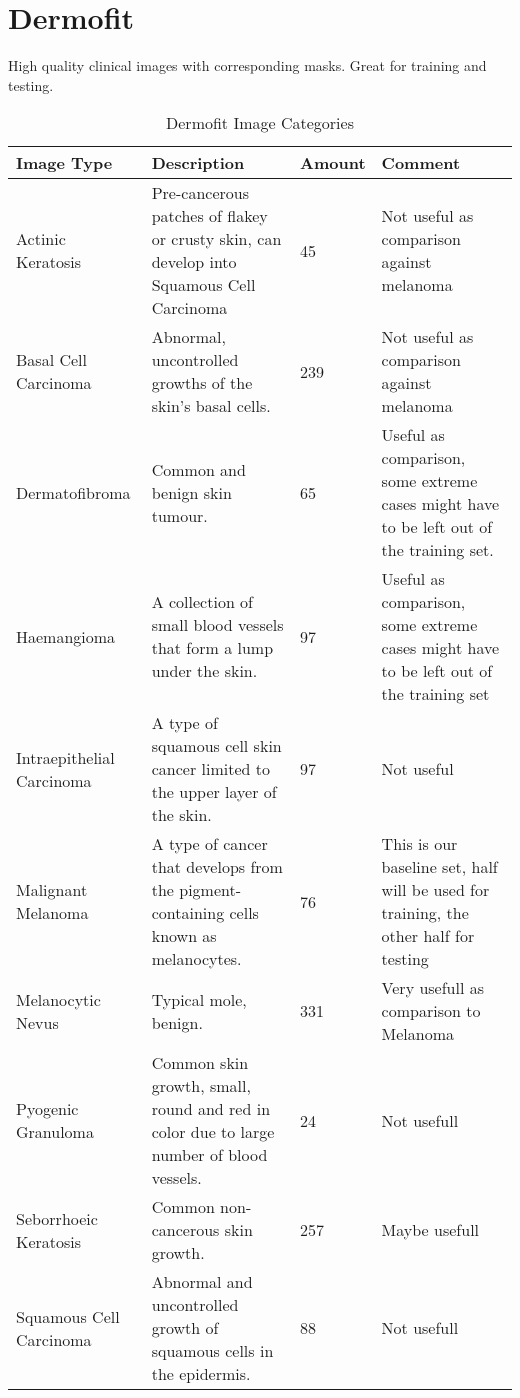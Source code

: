 \section{Dermofit}

High quality clinical images with corresponding masks. Great for training and testing.

\begin{table}[H]
\small
    \begin{tabular}{ | l | p{3.5cm} | l | p{3.5cm} |}
    \hline
    Image Type &  Description & Amount & Comment\\ \hline
    Actinic Keratosis &  Pre-cancerous patches of flakey or crusty skin, can develop into Squamous Cell Carcinoma
        & 45 & Not useful as comparison against melanoma \\ \hline
    Basal Cell Carcinoma &  Abnormal, uncontrolled growths of the skin's basal cells.
        & 239 & Not useful as comparison against melanoma \\ \hline
    Dermatofibroma &  Common and benign skin tumour.
        & 65 & Useful as comparison, some extreme cases might have to be left out of the training set. \\ \hline
    Haemangioma &  A collection of small blood vessels that form a lump under the skin.
        & 97 & Useful as comparison, some extreme cases might have to be left out of the training set \\ \hline
    Intraepithelial Carcinoma &  A type of squamous cell skin cancer limited to the upper layer of the skin.
        & 97 & Not useful \\ \hline
    Malignant Melanoma &  A type of cancer that develops from the pigment-containing cells known as melanocytes.
        & 76 & This is our baseline set, half will be used for training, the other half for testing \\ \hline
    Melanocytic Nevus &  Typical mole, benign.
        & 331 & Very usefull as comparison to Melanoma \\ \hline
    Pyogenic Granuloma &  Common skin growth, small, round and red in color due to large number of blood vessels.
        & 24 & Not usefull \\ \hline
    Seborrhoeic Keratosis &  Common non-cancerous skin growth.
        & 257 & Maybe usefull \\ \hline
    Squamous Cell Carcinoma &  Abnormal and uncontrolled growth of squamous cells in the epidermis.
        & 88 & Not usefull \\ \hline

    \end{tabular}

    \caption{Dermofit Image Categories}
    \label{fig:derm_cat}

\end{table}

